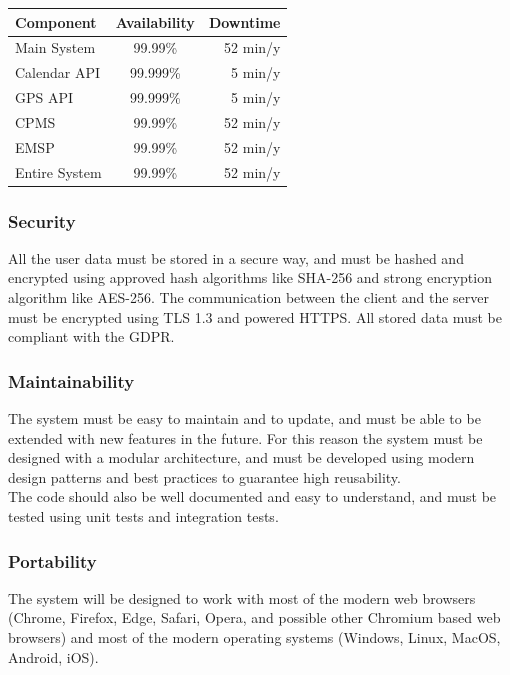 \documentclass[table, 12pt]{article} %
\begin{document}
    \begin{table}[H]
        \begin{center}
        \label{tab:availability}
        \begin{tabular}{l|c|r}
            \textbf{Component} & \textbf{Availability} & \textbf{Downtime}\\
            \hline
            Main System & 99.99\% & 52 min/y\\
            Calendar API & 99.999\% & 5 min/y\\
            GPS API & 99.999\% & 5 min/y\\
            CPMS & 99.99\% & 52 min/y\\
            EMSP & 99.99\% & 52 min/y\\
            \hline
            Entire System & 99.99\% & 52 min/y

        \end{tabular}
        \end{center}
    \end{table}

    \subsubsection{Security}
    All the user data must be stored in a secure way, and must be hashed and encrypted using approved hash algorithms like SHA-256 and strong encryption algorithm like AES-256.
    The communication between the client and the server must be encrypted using TLS 1.3 and powered HTTPS.
    All stored data must be compliant with the GDPR.

    \subsubsection{Maintainability}
    The system must be easy to maintain and to update, and must be able to be extended with new features in the future.
    For this reason the system must be designed with a modular architecture, and must be developed using modern design patterns and best practices to guarantee high reusability.\\
    The code should also be well documented and easy to understand, and must be tested using unit tests and integration tests.

    \subsubsection{Portability}
    The system will be designed to work with most of the modern web browsers (Chrome, Firefox, Edge, Safari, Opera, and possible other Chromium based web browsers) and most of the modern operating systems (Windows, Linux, MacOS, Android, iOS).
\end{document}
